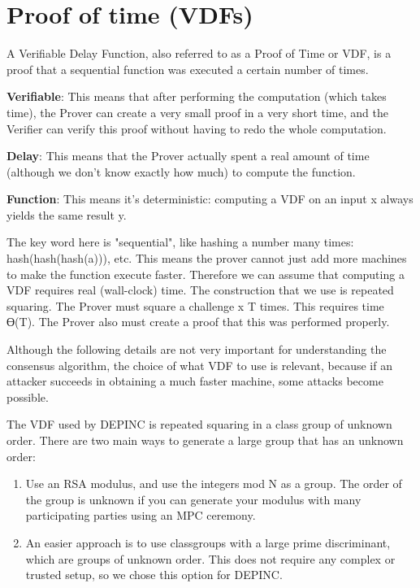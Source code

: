 \section{Proof of time (VDFs)}
\begin{flushleft}
    A Verifiable Delay Function, also referred to as a Proof of Time or VDF, is a proof that a sequential function was executed a certain number of times.
\end{flushleft}
\begin{flushleft}
    \textbf{Verifiable}: This means that after performing the computation (which takes time), the Prover can create a very small proof in a very short time, and the Verifier can verify this proof without having to redo the whole computation.
\end{flushleft}
\begin{flushleft}
    \textbf{Delay}: This means that the Prover actually spent a real amount of time (although we don't know exactly how much) to compute the function.
\end{flushleft}
\begin{flushleft}
    \textbf{Function}: This means it's deterministic: computing a VDF on an input x always yields the same result y.
\end{flushleft}
\begin{flushleft}
    The key word here is "sequential", like hashing a number many times: hash(hash(hash(a))), etc. This means the prover cannot just add more machines to make the function execute faster. Therefore we can assume that computing a VDF requires real (wall-clock) time. The construction that we use is repeated squaring. The Prover must square a challenge x T times. This requires time ϴ(T). The Prover also must create a proof that this was performed properly.
\end{flushleft}
\begin{flushleft}
    Although the following details are not very important for understanding the consensus algorithm, the choice of what VDF to use is relevant, because if an attacker succeeds in obtaining a much faster machine, some attacks become possible.
\end{flushleft}

\begin{flushleft}
    The VDF used by DEPINC is repeated squaring in a class group of unknown order. There are two main ways to generate a large group that has an unknown order:
\end{flushleft}
\begin{enumerate}
    \item Use an RSA modulus, and use the integers mod N as a group. The order of the group is unknown if you can generate your modulus with many participating parties using an MPC ceremony.
    \item An easier approach is to use classgroups with a large prime discriminant, which are groups of unknown order. This does not require any complex or trusted setup, so we chose this option for DEPINC.
\end{enumerate}
